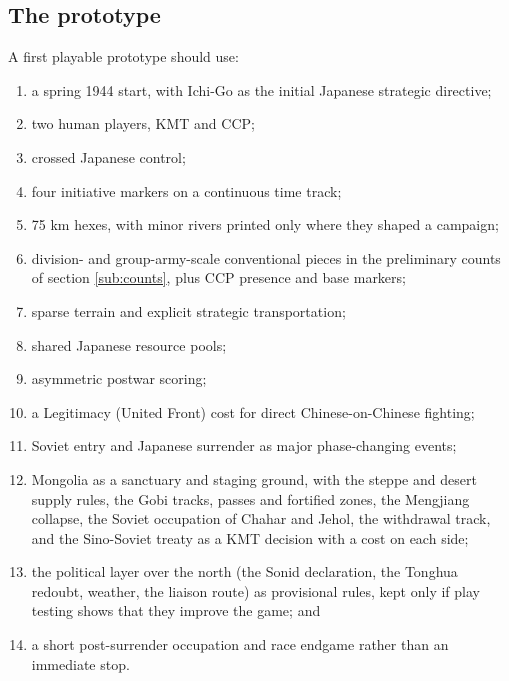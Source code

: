 \documentclass[11pt]{article}
\begin{document}
\subsection{The prototype}\label{sub:prototype}
A first playable prototype should use:
\begin{enumerate}
\item a spring 1944 start, with Ichi-Go as the initial Japanese strategic directive;
\item two human players, KMT and CCP;
\item crossed Japanese control;
\item four initiative markers on a continuous time track;
\item 75 km hexes, with minor rivers printed only where they shaped a campaign;
\item division- and group-army-scale conventional pieces in the preliminary counts of section \ref{sub:counts}, plus CCP presence and base markers;
\item sparse terrain and explicit strategic transportation;
\item shared Japanese resource pools;
\item asymmetric postwar scoring;
\item a Legitimacy (United Front) cost for direct Chinese-on-Chinese fighting;
\item Soviet entry and Japanese surrender as major phase-changing events;
\item Mongolia as a sanctuary and staging ground, with the steppe and desert supply rules, the Gobi tracks, passes and fortified zones, the Mengjiang collapse, the Soviet occupation of Chahar and Jehol, the withdrawal track, and the Sino-Soviet treaty as a KMT decision with a cost on each side;
\item the political layer over the north (the Sonid declaration, the Tonghua redoubt, weather, the liaison route) as provisional rules, kept only if play testing shows that they improve the game; and
\item a short post-surrender occupation and race endgame rather than an immediate stop.
\end{enumerate}
\end{document}
